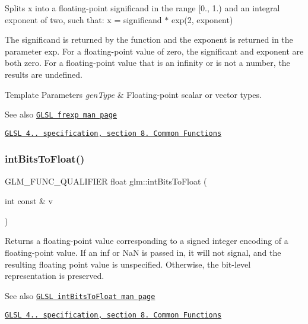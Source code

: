 Splits x into a floating-\/point significand in the range \mbox{[}0., 1.) and an integral exponent of two, such that\+: x = significand $\ast$ exp(2, exponent)

The significand is returned by the function and the exponent is returned in the parameter exp. For a floating-\/point value of zero, the significant and exponent are both zero. For a floating-\/point value that is an infinity or is not a number, the results are undefined.


\begin{DoxyTemplParams}{Template Parameters}
{\em gen\+Type} & Floating-\/point scalar or vector types.\\
\hline
\end{DoxyTemplParams}
\begin{DoxySeeAlso}{See also}
\href{http://www.opengl.org/sdk/docs/manglsl/xhtml/frexp.xml}{\tt G\+L\+SL frexp man page} 

\href{http://www.opengl.org/registry/doc/GLSLangSpec.4.20.8.pdf}{\tt G\+L\+SL 4.. specification, section 8. Common Functions} 
\end{DoxySeeAlso}
\mbox{\label{group__core__func__common_ga2650dc57b2148a6ffbce20944fb4d97a}} 
\subsubsection{\texorpdfstring{int\+Bits\+To\+Float()}{intBitsToFloat()}\hspace{0.1cm}{\footnotesize\ttfamily [1/2]}}
{\footnotesize\ttfamily G\+L\+M\+\_\+\+F\+U\+N\+C\+\_\+\+Q\+U\+A\+L\+I\+F\+I\+ER float glm\+::int\+Bits\+To\+Float (\begin{DoxyParamCaption}\item[{int const \&}]{v }\end{DoxyParamCaption})}

Returns a floating-\/point value corresponding to a signed integer encoding of a floating-\/point value. If an inf or NaN is passed in, it will not signal, and the resulting floating point value is unspecified. Otherwise, the bit-\/level representation is preserved.

\begin{DoxySeeAlso}{See also}
\href{http://www.opengl.org/sdk/docs/manglsl/xhtml/intBitsToFloat.xml}{\tt G\+L\+SL int\+Bits\+To\+Float man page} 

\href{http://www.opengl.org/registry/doc/GLSLangSpec.4.20.8.pdf}{\tt G\+L\+SL 4.. specification, section 8. Common Functions} 
\end{DoxySeeAlso}
\mbox{\label{group__core__func__common_gad21ab176dd0e6b59d923db5efca87f4e}} 
